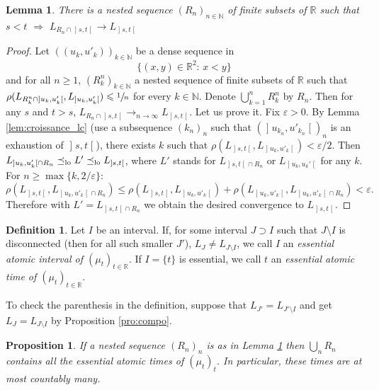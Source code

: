 \documentclass[10pt,a4paper]{article}
\theoremstyle{plain}
\newtheorem{pro}[them]{Proposition}
\newtheorem{lem}[them]{Lemma}
\theoremstyle{definition}
\newtheorem{defi}[them]{Definition}
\let\eps\varepsilon
\newcommand{\R}{\mathbb{R}}
\newcommand{\N}{\mathbb{N}}
\newcommand{\op}{\mathopen}
\newcommand{\clo}{\mathclose}
\newcommand{\leqlc}{\preceq_{\rm lo}}
\begin{document}
\begin{lem}\label{lem:convergence_couples}
There is a nested sequence $(R_n)_{n\in\N}$ of finite subsets of $\R$ such that $s<t$ $\Rightarrow$ $L_{R_n\cap\op]s,t\clo[}\to L_{\op]s,t\clo[}$
\end{lem}
\begin{proof} Let $((u_k,u'_k))_{k\in\N}$ be a dense sequence in
\[
\{(x,y)\in\R^2:\,x< y\}
\]
and for all $n\geq 1$, $(R_k^n)_{k\in\N}$ a nested sequence of finite subsets of $\R$ such that $\rho(L_{R_k^n\cap\op]u_k,u'_k\clo[},L_{\op]u_k,u'_k\clo[})\leqslant\sfrac1n$ for every $k\in \N$. Denote $\bigcup_{k=1}^n R^n_k$ by $R_n$. Then for any $s$ and $t>s$, $L_{R_n\cap\op]s,t\clo[}\to_{n\to\infty}L_{\op]s,t\clo[}$. Let us prove it. Fix $\eps>0$. By Lemma \ref{lem:croissance_lc} (use a subsequence $(k_n)_n$ such that $(\op]u_{k_n},u'_{k_n}\clo[)_n$ is an exhaustion of $\op]s,t\clo[$), there exists $k$ such that $\rho(L_{\op]s,t\clo[},L_{\op]u_k,u'_k\clo[})<\eps/2$. Then $L_{\op]u_k,u_k'\clo[\cap R_n}\leqlc L' \leqlc L_{\op]s,t\clo[}$, where $L'$ stands for $L_{\op]s,t\clo[\cap R_n}$ or $L_{\op]u_k,u_k'\clo[}$ for any $k$. For $n\geq\max\{k,2/\eps\}$:
\[\rho(L_{\op]s,t\clo[},L_{\op]u_k,u'_k\clo[\cap R_n})\leq \rho(L_{\op]s,t\clo[},L_{\op]u_k,u'_k\clo[})+ \rho(L_{\op]u_k,u'_k\clo[},L_{\op]u_k,u'_k\clo[\cap R_n})<\eps.\]
Therefore with $L'=L_{\op]s,t\clo[\cap R_n}$ we obtain the desired convergence to $L_{\op]s,t\clo[}$.
\end{proof}

\begin{defi}\label{defi:essentiel}Let $I$ be an interval. If, for some interval $J\supset I$ such that $J\setminus I$ is disconnected (then for all such smaller $J'$), $L_{J}\neq L_{J\setminus I}$, we call $I$ an \emph{essential atomic interval of $(\mu_t)_{t\in\R}$}. If $I=\{t\}$ is essential, we call $t$ an \emph{essential atomic time of $(\mu_t)_{t\in\R}$}.
\end{defi}

To check the parenthesis in the definition, suppose that $L_{J'}= L_{J'\setminus I}$ and get $L_{J}= L_{J\setminus I}$ by Proposition \ref{pro:compo}.

\begin{pro}\label{pro:denombrable}If a nested sequence $(R_n)_n$ is as in Lemma \ref{lem:convergence_couples} then $\bigcup_nR_n$ contains all the essential atomic times of $(\mu_t)_t$. In particular, these times are at most countably many.
\end{pro}
\end{document}

